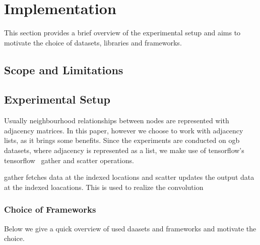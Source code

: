 \chapter{Implementation}
\label{sec:implement}

This section provides a brief overview of the experimental setup and aims to motivate the choice of datasets, libraries and frameworks.

\section{Scope and Limitations}
\label{sec:implement:scope}




\section{Experimental Setup}
\label{sec:implement:setup}
Usually neighbourhood relationships between nodes are represented with adjacency matrices. In this paper, however we choose to work with adjacency lists, as it brings some benefits. Since the experiments are conducted on \ac{ogb} datasets, where adjacency is represented as a list, we make use of tensorflow's tensorflow~\cite{tensorflow} gather and scatter operations.

gather fetches data at the indexed locations and scatter updates the output data at the indexed loacations. This is used to realize the convolution






\subsection{Choice of Frameworks}
\label{sec:implement:setup:choice}
Below we give a quick overview of used daasets and frameworks and motivate the choice.


